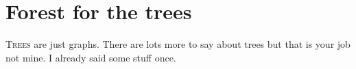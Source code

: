 \chapter{Forest for the trees}
\lettrine[lines=4]{T}{rees} are just graphs. There are lots more to say about trees but that is
your job not mine. I already said some stuff once.

